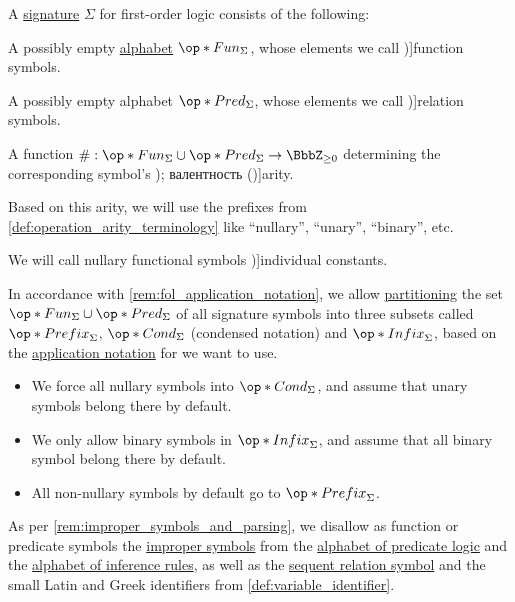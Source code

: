 \begin{definition}\label{def:fol_signature}
  A \hyperref[con:logical_system_signature]{signature} \( \Sigma \) for first-order logic consists of the following:
  \begin{thmenum}
     A possibly empty \hyperref[def:formal_language/alphabet]{alphabet} \( \op*{Fun}_\Sigma \), whose elements we call \term[ru=функциональные символы (\cite[84]{Герасимов2014Вычислимость})]{function symbols}.

     A possibly empty alphabet \( \op*{Pred}_\Sigma \), whose elements we call \term[ru=реляционные символы (\cite[84]{Герасимов2014Вычислимость})]{relation symbols}.

     A function \( {\#}: \op*{Fun}_\Sigma \cup \op*{Pred}_\Sigma \to \BbbZ_{\geq 0} \) determining the corresponding symbol's \term[ru=арность (\cite[84]{Герасимов2014Вычислимость}); валентность (\cite[73]{ШеньВерещагин2017ЯзыкиИИсчисления})]{arity}.

    Based on this arity, we will use the prefixes from \cref{def:operation_arity_terminology} like \enquote{nullary}, \enquote{unary}, \enquote{binary}, etc.

     We will call nullary functional symbols \term[ru=предметная константа, en=constants (\cite[83]{Hinman2005Logic})]{individual constants}.

    \mimprovised In accordance with \cref{rem:fol_application_notation}, we allow \hyperref[def:set_partition]{partitioning} the set \( \op*{Fun}_\Sigma \cup \op*{Pred}_\Sigma \) of all signature symbols into three subsets called \( \op*{Prefix}_\Sigma \), \( \op*{Cond}_\Sigma \) (condensed notation) and \( \op*{Infix}_\Sigma \), based on the \hyperref[def:function_application_notation]{application notation} for we want to use.

    \begin{itemize}
      \item We force all nullary symbols into \( \op*{Cond}_\Sigma \), and assume that unary symbols belong there by default.
      \item We only allow binary symbols in \( \op*{Infix}_\Sigma \), and assume that all binary symbol belong there by default.
      \item All non-nullary symbols by default go to \( \op*{Prefix}_\Sigma \).
    \end{itemize}
  \end{thmenum}

  As per \cref{rem:improper_symbols_and_parsing}, we disallow as function or predicate symbols the \hyperref[con:improper_symbol]{improper symbols} from the \hyperref[def:predicate_logic_alphabet]{alphabet of predicate logic} and the \hyperref[def:inference_rule_alphabet]{alphabet of inference rules}, as well as the \hyperref[def:sequent_alphabet]{sequent relation symbol} and the small Latin and Greek identifiers from \cref{def:variable_identifier}.
\end{definition}
